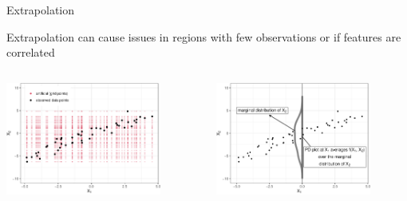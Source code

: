 \documentclass[11pt,compress,t,notes=noshow, aspectratio=169, xcolor=table]{beamer}
\begin{document}
\begin{frame}{Extrapolation}


Extrapolation can cause issues in regions with few observations or if features are correlated
 
\begin{columns}[T]
\begin{column}{0.5\textwidth}
\centering
\includegraphics[width=0.8\textwidth]{figure/ale_scatter_grid}
\end{column}
\begin{column}{0.5\textwidth}
\centering
\includegraphics[width=0.8\textwidth]{figure/ale_pdplot}
\end{column}
\end{columns}


\end{frame}
\end{document}
